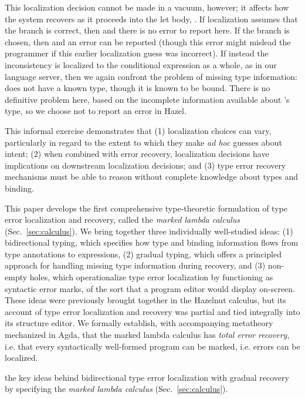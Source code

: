 This localization decision cannot be made in a vacuum, however; it affects how the system recovers as it proceeds into the let body, . 
If localization assumes that the  branch is correct, then  and there is no error to report here.
If the  branch is chosen, then  and an error can be reported (though this error might mislead the programmer if this earlier localization guess was incorrect). 
If instead the inconsistency is localized to the conditional expression as a whole, as in our language server, then we again confront the problem of missing type information: 
 does not have a known type,
though it is known to be bound. 
There is no definitive problem here, based on the incomplete information available about 's type, 
so we choose not to report an error in Hazel.

This informal exercise demonstrates that (1) localization choices can vary, particularly in regard to the extent to which they make \emph{ad hoc} guesses about intent;  
(2) when combined with error recovery, localization decisions have implications on downstream localization decisions; and 
(3) type error recovery mechanisms must be able to reason without complete knowledge about types and binding. 

This paper develops the first comprehensive {type-theoretic formulation} of type error localization and recovery, called the \emph{marked lambda calculus} (Sec.~\ref{sec:calculus}).
We bring together three individually well-studied ideas: (1) bidirectional typing, which specifies how type and binding information flows from 
type annotations to expressions, (2) gradual typing, which offers a principled approach for handling missing type information during recovery, and 
(3) non-empty holes, which operationalize type error localization by functioning as syntactic error marks, of the sort that a program editor would display on-screen.
These ideas were previously brought together in the Hazelnut calculus, but its account of type error localization and recovery was partial and tied integrally into its structure editor. 
We formally establish, with accompanying metatheory mechanized in Agda, that the marked lambda calculus has \emph{total error recovery}, i.e. that every syntactically well-formed program 
can be marked, i.e. errors can be localized. 



the key ideas behind bidirectional type error localization with gradual recovery by specifying 
the \emph{marked lambda calculus} (Sec.~\ref{sec:calculus}). 


